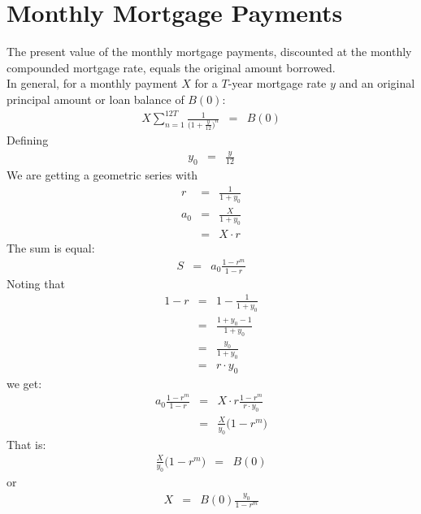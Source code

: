\section{Monthly Mortgage Payments}
The present value of the monthly mortgage payments, discounted at the monthly compounded mortgage rate, equals the original amount borrowed.\\
In general, for a monthly payment $X$ for a $T$-year mortgage rate $y$ and an original principal amount or loan balance of $B(0)$:
\begin{eqnarray}
	X\sum_{n = 1}^{12T}\frac{1}{\Big(1 + \frac{y}{12}\Big)^{n}} &=& B(0)
\end{eqnarray}
Defining
\begin{eqnarray}
	y_{0} &=& \frac{y}{12}
\end{eqnarray}
We are getting a geometric series with
\begin{eqnarray}
	r &=& \frac{1}{1 + y_{0}}\\
	a_{0} &=& \frac{X}{1 + y_{0}}\\
		  &=& X\cdot r
\end{eqnarray}
The sum is equal:
\begin{eqnarray}
	S &=& a_{0}\frac{1 - r^{m}}{1 - r} 
\end{eqnarray}
Noting that
\begin{eqnarray}
	1 - r &=& 1 - \frac{1}{1 + y_{0}}\\
		  &=& \frac{1 + y_{0} - 1}{1 + y_{0}}\\
		  &=& \frac{y_{0}}{1+y_{0}}\\
		  &=& r\cdot y_{0}
\end{eqnarray}
we get:
\begin{eqnarray}
	a_{0}\frac{1 - r^{m}}{1 - r} &=& X\cdot r\frac{1 - r^{m}}{r\cdot y_{0}}\\
	&=& \frac{X}{y_{0}}\Big(1 - r^{m}\Big)
\end{eqnarray}
That is:
\begin{eqnarray}
\frac{X}{y_{0}}\Big(1 - r^{m}\Big) &=& B(0)
\end{eqnarray}
or
\begin{eqnarray}
	X &=& B(0)\frac{y_{0}}{1 - r^{m}}
\end{eqnarray}